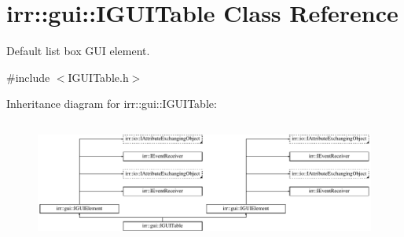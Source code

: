 \hypertarget{classirr_1_1gui_1_1IGUITable}{}\section{irr\+:\+:gui\+:\+:I\+G\+U\+I\+Table Class Reference}
\label{classirr_1_1gui_1_1IGUITable}


Default list box G\+UI element.  




{\ttfamily \#include $<$I\+G\+U\+I\+Table.\+h$>$}

Inheritance diagram for irr\+:\+:gui\+:\+:I\+G\+U\+I\+Table\+:\begin{figure}[H]
\begin{center}
\leavevmode
\includegraphics[height=4.038462cm]{classirr_1_1gui_1_1IGUITable}
\end{center}
\end{figure}
